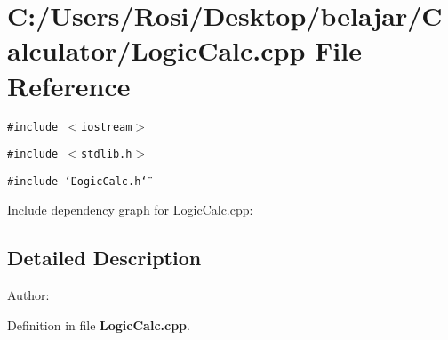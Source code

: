 \section{C:/Users/Rosi/Desktop/belajar/Calculator/Logic\-Calc.cpp File Reference}
\label{_logic_calc_8cpp}
{\tt \#include $<$iostream$>$}\par
{\tt \#include $<$stdlib.h$>$}\par
{\tt \#include \char`\"{}Logic\-Calc.h\char`\"{}}\par


Include dependency graph for Logic\-Calc.cpp:

\subsection{Detailed Description}
\begin{Desc}
\item[Author:]\end{Desc}


Definition in file {\bf Logic\-Calc.cpp}.